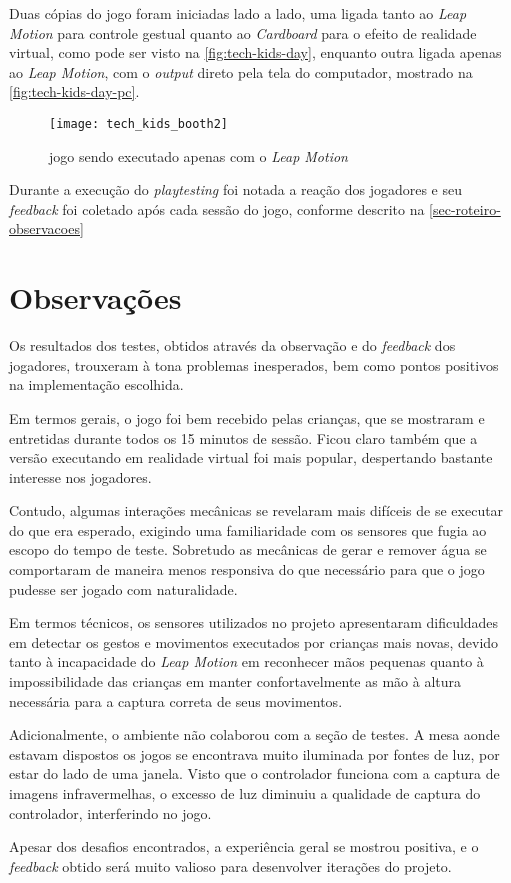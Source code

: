 Duas cópias do jogo foram iniciadas lado a lado, uma ligada tanto 
ao \textit{Leap Motion} para controle gestual quanto ao \textit{Cardboard} 
para o efeito de realidade virtual, como pode ser visto 
na \autoref{fig:tech-kids-day}, enquanto outra ligada apenas ao 
\textit{Leap Motion}, com o \textit{output} direto pela tela do computador, 
mostrado na \autoref{fig:tech-kids-day-pc}.

\begin{figure}[h]
	\centering
	\caption{jogo sendo executado apenas com o \textit{Leap Motion}}
	\texttt{[image: tech\_kids\_booth2]}
	\legend{\fonteAP}
	\label{fig:tech-kids-day-pc}
\end{figure}

Durante a execução do \textit{playtesting} foi notada a reação dos 
jogadores e seu \textit{feedback} foi coletado após cada sessão do jogo, 
conforme descrito na \autoref{sec-roteiro-observacoes}

\section{Observações}\label{sec-roteiro-observacoes}

Os resultados dos testes, obtidos através da observação e do 
\textit{feedback} dos jogadores, trouxeram à tona problemas inesperados, 
bem como pontos positivos na implementação escolhida.

Em termos gerais, o jogo foi bem recebido pelas crianças, que se 
mostraram e entretidas durante todos os 15 minutos de sessão. Ficou claro 
também que a versão executando em realidade virtual foi mais popular, 
despertando bastante interesse nos jogadores.

Contudo, algumas interações mecânicas se revelaram mais difíceis de se 
executar do que era esperado, exigindo uma familiaridade com os sensores 
que fugia ao escopo do tempo de teste. Sobretudo as mecânicas de gerar e 
remover água se comportaram de maneira menos responsiva do que necessário 
para que o jogo pudesse ser jogado com naturalidade.

Em termos técnicos, os sensores utilizados no projeto apresentaram 
dificuldades em detectar os gestos e movimentos executados por crianças 
mais novas, devido tanto à incapacidade do \textit{Leap Motion} em 
reconhecer mãos pequenas quanto à impossibilidade das crianças em 
manter confortavelmente as mão à altura necessária para a captura 
correta de seus movimentos. 

Adicionalmente, o ambiente não colaborou com a seção de testes. A mesa 
aonde estavam dispostos os jogos se encontrava muito iluminada por 
fontes de luz, por estar do lado de uma janela. Visto que o controlador 
funciona com a captura de imagens infravermelhas, o excesso de luz 
diminuiu a qualidade de captura do controlador, interferindo no jogo.

Apesar dos desafios encontrados, a experiência geral se mostrou 
positiva, e o \textit{feedback} obtido será muito valioso para desenvolver 
iterações do projeto.

